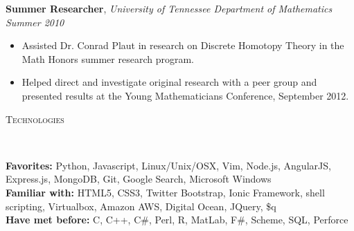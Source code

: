 \documentclass[10pt]{article}
\newenvironment{changemargin}[2]{%
  \begin{list}{}{%
    \setlength{\topsep}{0pt}%
    \setlength{\leftmargin}{#1}%
    \setlength{\rightmargin}{#2}%
    \setlength{\listparindent}{\parindent}%
    \setlength{\itemindent}{\parindent}%
    \setlength{\parsep}{\parskip}%
  }%
  \item[]}{\end{list}
}
\newcommand{\lineover}{
	\begin{changemargin}{-0.05in}{-0.05in}
		\vspace*{-8pt}
		\hrulefill \\
		\vspace*{-2pt}
	\end{changemargin}
}
\newcommand{\header}[1]{
	\begin{changemargin}{-0.5in}{-0.5in}
		\scshape{#1}\\
  	\lineover
	\end{changemargin}
}
\newenvironment{body} {
	\vspace*{-16pt}
	\begin{changemargin}{-0.25in}{-0.5in}
  }	
	{\end{changemargin}
}
\begin{document}
\begin{body}
	\textbf {Summer Researcher}, \emph{University of Tennessee Department of Mathematics} \hfill \emph{Summer 2010}\\
	\vspace*{-4pt}
	\begin{itemize} \itemsep -0pt
		\item Assisted Dr. Conrad Plaut in research on Discrete Homotopy Theory in the Math Honors summer research program.
		\item Helped direct and investigate original research with a peer group and presented results at the Young Mathematicians Conference, September 2012.
	\end{itemize}
	\begin{comment}
	\textbf {Assistant Waterfront Director}, \emph{Kia Kima Scout Reservation} \hfill \emph{Summers, 2008 - 09}\\
	\vspace*{-4pt}
	\begin{itemize} \itemsep -0pt
		\item Instructed waterfront merit badges, including lifesaving and CPR skills.
		\item Managed other instructors and ensured safety with both preventative and remedial action.
	\end{itemize}
	\end{comment}
	
\end{body}

\smallskip



\header{Technologies}

\begin{body}
	\vspace{14pt}
	\textbf{Favorites:}{} Python, Javascript, Linux/Unix/OSX, Vim, Node.js, AngularJS, Express.js, MongoDB, Git, Google Search, Microsoft Windows\\
	\medskip
	\textbf{Familiar with:}{} HTML5, CSS3, Twitter Bootstrap, Ionic Framework, shell scripting, Virtualbox, Amazon AWS,
    Digital Ocean, JQuery, \$q\\
	\medskip
	\textbf{Have met before:}{} C, C++, C\#, Perl, R, MatLab, F\#, Scheme, SQL, Perforce \\
	\medskip
\end{body}
\end{document}
